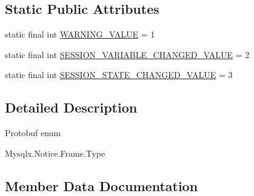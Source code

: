 \subsection*{Static Public Attributes}
\begin{DoxyCompactItemize}
\item 
static final int \mbox{\hyperlink{enumcom_1_1mysql_1_1cj_1_1x_1_1protobuf_1_1_mysqlx_notice_1_1_frame_1_1_type_af47cb77be84f8218ed6fda8113c697dc}{W\+A\+R\+N\+I\+N\+G\+\_\+\+V\+A\+L\+UE}} = 1
\item 
static final int \mbox{\hyperlink{enumcom_1_1mysql_1_1cj_1_1x_1_1protobuf_1_1_mysqlx_notice_1_1_frame_1_1_type_afa6a2e75f31b141be51060eddeccaea1}{S\+E\+S\+S\+I\+O\+N\+\_\+\+V\+A\+R\+I\+A\+B\+L\+E\+\_\+\+C\+H\+A\+N\+G\+E\+D\+\_\+\+V\+A\+L\+UE}} = 2
\item 
static final int \mbox{\hyperlink{enumcom_1_1mysql_1_1cj_1_1x_1_1protobuf_1_1_mysqlx_notice_1_1_frame_1_1_type_a3708b28b79956ca46e808de7b4c978a8}{S\+E\+S\+S\+I\+O\+N\+\_\+\+S\+T\+A\+T\+E\+\_\+\+C\+H\+A\+N\+G\+E\+D\+\_\+\+V\+A\+L\+UE}} = 3
\end{DoxyCompactItemize}


\subsection{Detailed Description}
Protobuf enum
\begin{DoxyCode}
Mysqlx.Notice.Frame.Type 
\end{DoxyCode}
 

\subsection{Member Data Documentation}
\mbox{\label{enumcom_1_1mysql_1_1cj_1_1x_1_1protobuf_1_1_mysqlx_notice_1_1_frame_1_1_type_ac75fca29961449671a16d2eecc708c58}} 
